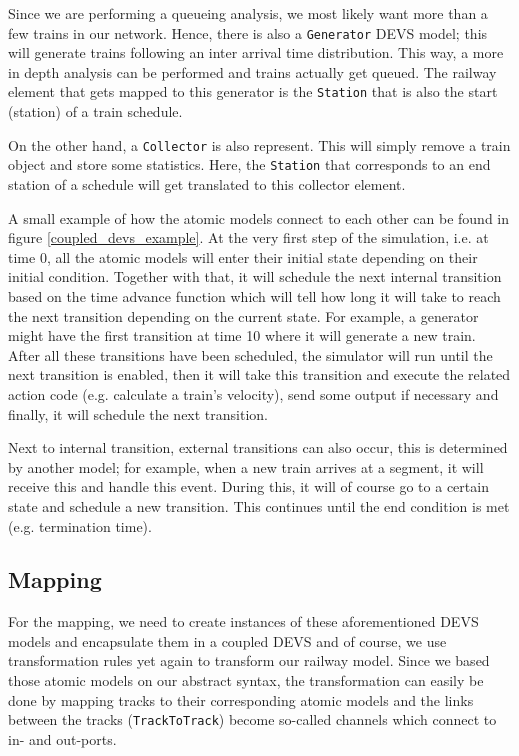 \documentclass{article}
\begin{document}
Since we are performing a queueing analysis, we most likely want more than a few trains in our network. Hence, there is also a \texttt{Generator} DEVS model; this will generate trains following an inter arrival time distribution. This way, a more in depth analysis can be performed and trains actually get queued. The railway element that gets mapped to this generator is the \texttt{Station} that is also the start (station) of a train schedule.

On the other hand, a \texttt{Collector} is also represent. This will simply remove a train object and store some statistics. Here, the \texttt{Station} that corresponds to an end station of a schedule will get translated to this collector element.

A small example of how the atomic models connect to each other can be found in figure \ref{coupled_devs_example}. At the very first step of the simulation, i.e. at time 0, all the atomic models will enter their initial state depending on their initial condition. Together with that, it will schedule the next internal transition based on the time advance function which will tell how long it will take to reach the next transition depending on the current state. For example, a generator might have the first transition at time 10 where it will generate a new train. After all these transitions have been scheduled, the simulator will run until the next transition is enabled, then it will take this transition and execute the related action code (e.g. calculate a train's velocity), send some output if necessary and finally, it will schedule the next transition.

Next to internal transition, external transitions can also occur, this is determined by another model; for example, when a new train arrives at a segment, it will receive this and handle this event. During this, it will of course go to a certain state and schedule a new transition. This continues until the end condition is met (e.g. termination time).

\subsection{Mapping}

For the mapping, we need to create instances of these aforementioned DEVS models and encapsulate them in a coupled DEVS and of course, we use transformation rules yet again to transform our railway model. Since we based those atomic models on our abstract syntax, the transformation can easily be done by mapping tracks to their corresponding atomic models and the links between the tracks (\texttt{TrackToTrack}) become so-called channels which connect to in- and out-ports.
\end{document}
